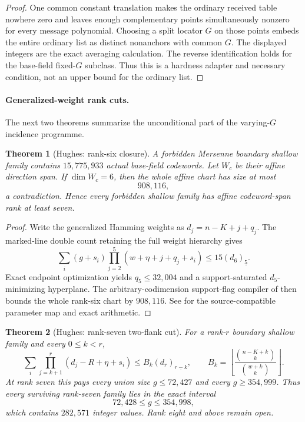 \documentclass[11pt,a4paper]{amsart}
\numberwithin{equation}{section}
\newtheorem{theorem}{Theorem}[section]
\theoremstyle{remark}
\newcommand{\floor}[1]{\left\lfloor#1\right\rfloor}
\begin{document}
\begin{proof}
One common constant translation makes the ordinary received table nowhere zero and leaves enough complementary points simultaneously nonzero for every message polynomial.  Choosing a split locator $G$ on those points embeds the entire ordinary list as distinct nonanchors with common $G$.  The displayed integers are the exact averaging calculation.  The reverse identification holds for the base-field fixed-$G$ subclass.  Thus this is a hardness adapter and necessary condition, not an upper bound for the ordinary list.
\end{proof}

\paragraph{Generalized-weight rank cuts.}
The next two theorems summarize the unconditional part of the varying-$G$ incidence programme.

\begin{theorem}[Hughes: rank-six closure]\label{thm:m31-rank6}
A forbidden Mersenne boundary shallow family contains $15{,}775{,}933$ actual base-field codewords.  Let $W_c$ be their affine direction span.  If $\dim W_c=6$, then the whole affine chart has size at most
\[
 908{,}116,
\]
a contradiction.  Hence every forbidden shallow family has affine codeword-span rank at least seven.
\end{theorem}

\begin{proof}
Write the generalized Hamming weights as $d_j=n-K+j+q_j$.  The marked-line double count retaining the full weight hierarchy gives
\[
 \sum_i(g+s_i)\prod_{j=2}^{5}(w+\eta+j+q_j+s_i)
 \le15(d_6)_{\underline5}.
\]
Exact endpoint optimization yields $q_5\le32{,}004$ and a support-saturated $d_5$-minimizing hyperplane.  The arbitrary-codimension support-flag compiler of \cite{ChoGF26} then bounds the whole rank-six chart by $908{,}116$.  See \cite{HughesM31Rank626} for the source-compatible parameter map and exact arithmetic.
\end{proof}

\begin{theorem}[Hughes: rank-seven two-flank cut]\label{thm:m31-rank7}
For a rank-$r$ boundary shallow family and every $0\le k<r$,
\[
 \sum_i\prod_{j=k+1}^{r}(d_j-R+\eta+s_i)
 \le B_k(d_r)_{\underline{r-k}},\qquad
 B_k=\floor{\frac{\binom{n-K+k}{k}}{\binom{w+k}{k}}}.
\]
At rank seven this pays every union size $g\le72{,}427$ and every $g\ge354{,}999$.  Thus every surviving rank-seven family lies in the exact interval
\[
 72{,}428\le g\le354{,}998,
\]
which contains $282{,}571$ integer values.  Rank eight and above remain open.
\end{theorem}
\end{document}
